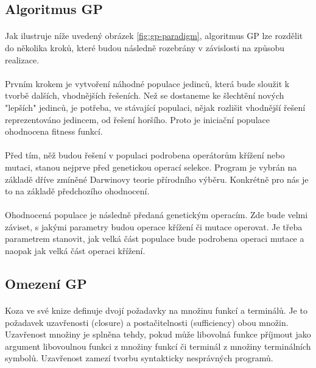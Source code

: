 \documentclass[bc,male,java,dept460]{diploma}		%
\begin{document}
\subsection{Algoritmus GP}
\paragraph*{}
Jak ilustruje níže uvedený obrázek \ref{fig:gp-paradigm}, algoritmus GP lze rozdělit do několika kroků, které budou následně rozebrány v závislosti na způsobu realizace.

\paragraph*{}
Prvním krokem je vytvoření náhodné populace jedinců, která bude sloužit k tvorbě dalších, vhodnějších řešeních.
Než se dostaneme ke šlechtění nových "lepších" jedinců, je potřeba, ve stávající populaci, nějak rozlišit vhodnější řešení reprezentováno jedincem, od řešení horšího. Proto je iniciační populace ohodnocena fitness funkcí.

\paragraph*{}
Před tím, něž budou řešení v populaci podrobena operátorům křížení nebo mutaci, stanou nejprve před genetickou operací selekce. Program je vybrán na základě dříve zmíněné Darwinovy teorie přírodního výběru. Konkrétně pro nás je to na základě předchozího ohodnocení.

\paragraph*{}
Ohodnocená populace je následně předaná genetickým operacím. Zde bude velmi záviset, s jakými parametry budou operace křížení či mutace operovat. Je třeba parametrem stanovit, jak velká část populace bude podrobena operaci mutace a naopak jak velká část operaci křížení. 

\subsection{Omezení GP}
\paragraph*{}
Koza ve své knize definuje \cite{kozagp} dvojí požadavky na množinu funkcí a terminálů. Je to požadavek uzavřenosti (closure) a postačitelnosti (sufficiency) obou množin. Uzavřenost množiny je splněna tehdy, pokud může libovolná funkce příjmout jako argument libovoulnou funkci z množiny funkcí či terminál z množiny terminálních symbolů. Uzavřenost zamezí tvorbu syntakticky nesprávných programů.
\end{document}
